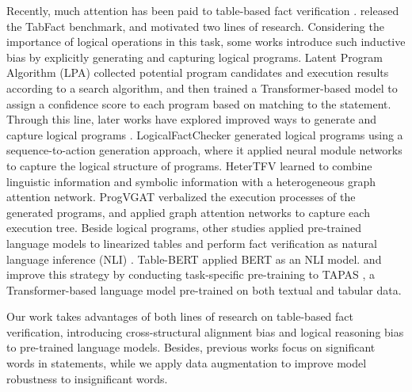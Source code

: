 \documentclass[11pt]{article}
\begin{document}
Recently, much attention has been paid to table-based fact verification \cite{chen2019tabfact, zhong2020logicalfactchecker, yang2020program, eisenschlos2020understanding, shi2020learn, dong2021structural}. \citet{chen2019tabfact} released the TabFact benchmark, and motivated two lines of research. 
Considering the importance of logical operations in this task, some works introduce such inductive bias by explicitly generating and capturing logical programs.
Latent Program Algorithm (LPA) \cite{chen2019tabfact} collected potential program candidates and execution results according to a search algorithm, and then trained a Transformer-based \cite{vaswani2017attention} model to assign a confidence score to each program based on matching to the statement.
Through this line, later works have explored improved ways to generate and capture logical programs \cite{zhong2020logicalfactchecker, yang2020program}.
LogicalFactChecker \cite{zhong2020logicalfactchecker} generated logical programs using a sequence-to-action generation approach, where it applied neural module networks \cite{andreas2016learning} to capture the logical structure of programs.
HeterTFV \cite{shi2020learn} learned to combine linguistic information and symbolic information with a heterogeneous graph attention network.
ProgVGAT \cite{yang2020program} verbalized the execution processes of the generated programs, and applied graph attention networks \cite{velivckovic2017graph} to capture each execution tree.
Beside logical programs, other studies applied pre-trained language models to linearized tables and perform fact verification as natural language inference (NLI) \cite{chen2019tabfact, eisenschlos2020understanding, dong2021structural}.
Table-BERT \cite{chen2019tabfact} applied BERT \cite{devlin2019bert} as an NLI model. 
\citet{eisenschlos2020understanding} and \citet{dong2021structural} improve this strategy by conducting task-specific pre-training to TAPAS \cite{herzig2020tapas}, a Transformer-based language model pre-trained on both textual and tabular data.


Our work takes advantages of both lines of research on table-based fact verification, introducing cross-structural alignment bias and logical reasoning bias to pre-trained language models. 
Besides, previous works focus on significant words in statements, while we apply data augmentation to improve model robustness to insignificant words. 
\end{document}
